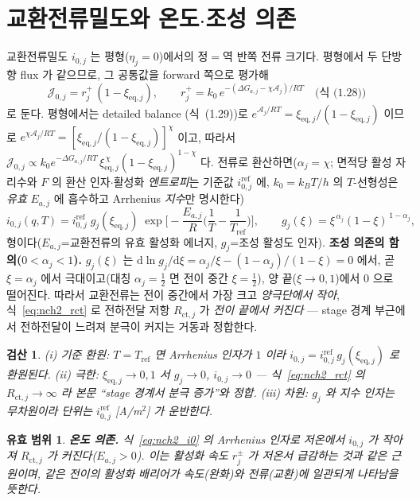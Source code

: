 \documentclass[11pt,a4paper]{article}
\newtheorem*{boundbox}{유효 범위}
\newtheorem*{verifybox}{검산}
\newcommand{\dd}{\mathrm{d}}
\newcommand{\eq}{\mathrm{eq}}
\newcommand{\ct}{\mathrm{ct}}
\begin{document}
\section{교환전류밀도와 온도$\cdot$조성 의존}\label{sec:nch2_i0}
교환전류밀도 $i_{0,j}$ 는 평형($\eta_j=0$)에서의 정$=$역 반쪽 전류 크기다. 평형에서 두 단방향 flux 가 같으므로,
그 공통값을 forward 쪽으로 평가해
\begin{equation*}
\mathcal J_{0,j}=r_j^+\,(1-\xi_{\eq,j}),\qquad r_j^+=k_0\,e^{-(\Delta G_{a,j}-\chi\mathcal A_j)/RT}\quad\text{(식~(1.28))}
\end{equation*}
로 둔다. 평형에서는 detailed balance
(식~(1.29))로 $e^{\mathcal A_j/RT}=\xi_{\eq,j}/(1-\xi_{\eq,j})$ 이므로 $e^{\chi\mathcal A_j/RT}=[\xi_{\eq,j}
/(1-\xi_{\eq,j})]^{\chi}$ 이고, 따라서 $\mathcal J_{0,j}\propto k_0e^{-\Delta G_{a,j}/RT}\,\xi_{\eq,j}^{\,\chi}
(1-\xi_{\eq,j})^{1-\chi}$ 다. 전류로 환산하면($\alpha_j=\chi$; 면적당 활성 자리수와 $F$ 의 환산 인자$\cdot$활성화 \emph{엔트로피}는 기준값
$i_{0,j}^{\mathrm{ref}}$ 에, $k_0=k_BT/h$ 의 $T$-선형성은 \emph{유효} $E_{a,j}$ 에 흡수하고 Arrhenius \emph{지수}만
명시한다)
\begin{equation}
i_{0,j}(q,T)=i_{0,j}^{\mathrm{ref}}\;g_j(\xi_{\eq,j})\;\exp\!\Big[-\frac{E_{a,j}}{R}\Big(\frac1T-\frac1{T_{\mathrm{ref}}}\Big)\Big],
\qquad g_j(\xi)=\xi^{\,\alpha_j}(1-\xi)^{\,1-\alpha_j},
\label{eq:nch2_i0}
\end{equation}
형이다($E_{a,j}$=교환전류의 유효 활성화 에너지, $g_j$=조성 활성도 인자). \textbf{조성 의존의 함의($0<\alpha_j<1$).} $g_j(\xi)$ 는 $\dd\ln g_j/\dd\xi=\alpha_j/\xi-(1-\alpha_j)/(1-\xi)=0$ 에서, 곧 $\xi=\alpha_j$
에서 극대이고(대칭 $\alpha_j=\tfrac12$ 면 전이 중간 $\xi=\tfrac12$), 양 끝($\xi\to0,1$)에서 $0$ 으로 떨어진다. 따라서
교환전류는 전이 중간에서 가장 크고 \emph{양극단에서 작아}, 식~\eqref{eq:nch2_rct} 로 전하전달 저항 $R_{\ct,j}$ 가
\emph{전이 끝에서 커진다} — stage 경계 부근에서 전하전달이 느려져 분극이 커지는 거동과 정합한다.
\begin{verifybox}
(i) \emph{기준 환원}: $T=T_{\mathrm{ref}}$ 면 Arrhenius 인자가 $1$ 이라 $i_{0,j}=i_{0,j}^{\mathrm{ref}}\,g_j(\xi_{\eq,j})$
로 환원된다. (ii) \emph{극한}: $\xi_{\eq,j}\to0,1$ 서 $g_j\to0$, $i_{0,j}\to0$ — 식~\eqref{eq:nch2_rct} 의
$R_{\ct,j}\to\infty$ 라 본문 ``stage 경계서 분극 증가''와 정합. (iii) \emph{차원}: $g_j$ 와 지수 인자는 무차원이라
단위는 $i_{0,j}^{\mathrm{ref}}$ [A/m$^2$] 가 운반한다.
\end{verifybox}
\begin{boundbox}
\textbf{온도 의존.} 식~\eqref{eq:nch2_i0} 의 Arrhenius 인자로 저온에서 $i_{0,j}$ 가 작아져 $R_{\ct,j}$ 가
커진다($E_{a,j}>0$). 이는 활성화 속도 $r_j^\pm$ 가 저온서 급감하는 것과 같은 근원이며, 같은 전이의 활성화
배리어가 \emph{속도}(완화)와 \emph{전류}(교환)에 일관되게 나타남을 뜻한다.
\end{boundbox}
\end{document}
